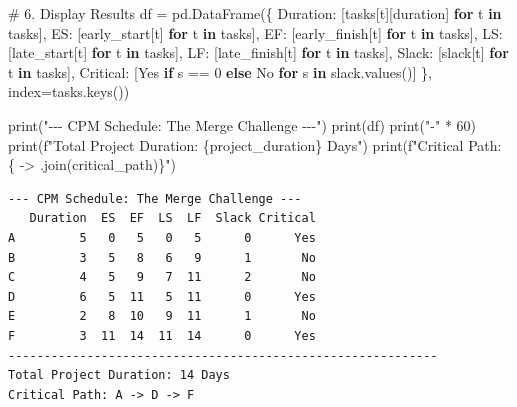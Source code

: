 \documentclass[
  letterpaper,
  DIV=11,
  numbers=noendperiod]{scrreprt}
\newenvironment{Shaded}{\begin{snugshade}}{\end{snugshade}}
\newcommand{\BuiltInTok}[1]{\textcolor[rgb]{0.00,0.23,0.31}{#1}}
\newcommand{\CommentTok}[1]{\textcolor[rgb]{0.37,0.37,0.37}{#1}}
\newcommand{\ControlFlowTok}[1]{\textcolor[rgb]{0.00,0.23,0.31}{\textbf{#1}}}
\newcommand{\DecValTok}[1]{\textcolor[rgb]{0.68,0.00,0.00}{#1}}
\newcommand{\KeywordTok}[1]{\textcolor[rgb]{0.00,0.23,0.31}{\textbf{#1}}}
\newcommand{\NormalTok}[1]{\textcolor[rgb]{0.00,0.23,0.31}{#1}}
\newcommand{\OperatorTok}[1]{\textcolor[rgb]{0.37,0.37,0.37}{#1}}
\newcommand{\SpecialCharTok}[1]{\textcolor[rgb]{0.37,0.37,0.37}{#1}}
\newcommand{\SpecialStringTok}[1]{\textcolor[rgb]{0.13,0.47,0.30}{#1}}
\newcommand{\StringTok}[1]{\textcolor[rgb]{0.13,0.47,0.30}{#1}}
\begin{document}
\begin{Shaded}
\begin{Highlighting}[]
\CommentTok{\# 6. Display Results}
\NormalTok{df }\OperatorTok{=}\NormalTok{ pd.DataFrame(\{}
    \StringTok{\textquotesingle{}Duration\textquotesingle{}}\NormalTok{: [tasks[t][}\StringTok{\textquotesingle{}duration\textquotesingle{}}\NormalTok{] }\ControlFlowTok{for}\NormalTok{ t }\KeywordTok{in}\NormalTok{ tasks],}
    \StringTok{\textquotesingle{}ES\textquotesingle{}}\NormalTok{: [early\_start[t] }\ControlFlowTok{for}\NormalTok{ t }\KeywordTok{in}\NormalTok{ tasks],}
    \StringTok{\textquotesingle{}EF\textquotesingle{}}\NormalTok{: [early\_finish[t] }\ControlFlowTok{for}\NormalTok{ t }\KeywordTok{in}\NormalTok{ tasks],}
    \StringTok{\textquotesingle{}LS\textquotesingle{}}\NormalTok{: [late\_start[t] }\ControlFlowTok{for}\NormalTok{ t }\KeywordTok{in}\NormalTok{ tasks],}
    \StringTok{\textquotesingle{}LF\textquotesingle{}}\NormalTok{: [late\_finish[t] }\ControlFlowTok{for}\NormalTok{ t }\KeywordTok{in}\NormalTok{ tasks],}
    \StringTok{\textquotesingle{}Slack\textquotesingle{}}\NormalTok{: [slack[t] }\ControlFlowTok{for}\NormalTok{ t }\KeywordTok{in}\NormalTok{ tasks],}
    \StringTok{\textquotesingle{}Critical\textquotesingle{}}\NormalTok{: [}\StringTok{\textquotesingle{}Yes\textquotesingle{}} \ControlFlowTok{if}\NormalTok{ s }\OperatorTok{==} \DecValTok{0} \ControlFlowTok{else} \StringTok{\textquotesingle{}No\textquotesingle{}} \ControlFlowTok{for}\NormalTok{ s }\KeywordTok{in}\NormalTok{ slack.values()]}
\NormalTok{\}, index}\OperatorTok{=}\NormalTok{tasks.keys())}

\BuiltInTok{print}\NormalTok{(}\StringTok{"{-}{-}{-} CPM Schedule: The Merge Challenge {-}{-}{-}"}\NormalTok{)}
\BuiltInTok{print}\NormalTok{(df)}
\BuiltInTok{print}\NormalTok{(}\StringTok{"{-}"} \OperatorTok{*} \DecValTok{60}\NormalTok{)}
\BuiltInTok{print}\NormalTok{(}\SpecialStringTok{f"Total Project Duration: }\SpecialCharTok{\{}\NormalTok{project\_duration}\SpecialCharTok{\}}\SpecialStringTok{ Days"}\NormalTok{)}
\BuiltInTok{print}\NormalTok{(}\SpecialStringTok{f"Critical Path: }\SpecialCharTok{\{}\StringTok{\textquotesingle{} {-}\textgreater{} \textquotesingle{}}\SpecialCharTok{.}\NormalTok{join(critical\_path)}\SpecialCharTok{\}}\SpecialStringTok{"}\NormalTok{)}
\end{Highlighting}
\end{Shaded}

\begin{verbatim}
--- CPM Schedule: The Merge Challenge ---
   Duration  ES  EF  LS  LF  Slack Critical
A         5   0   5   0   5      0      Yes
B         3   5   8   6   9      1       No
C         4   5   9   7  11      2       No
D         6   5  11   5  11      0      Yes
E         2   8  10   9  11      1       No
F         3  11  14  11  14      0      Yes
------------------------------------------------------------
Total Project Duration: 14 Days
Critical Path: A -> D -> F
\end{verbatim}
\end{document}
